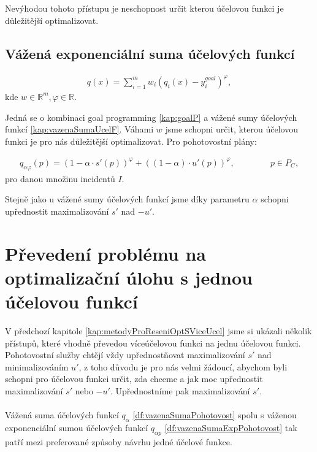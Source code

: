 Nevýhodou tohoto přístupu je neschopnost určit kterou účelovou funkci je důležitější optimalizovat.

\subsection{Vážená exponenciální suma účelových funkcí}\label{kap:vazenaSumUcF}

\begin{definice}
  \begin{align*}
    q(x) = \sum_{i=1}^{m} w_i (q_i(x) - y_i^{goal})^\varphi,
  \end{align*}
  kde $w \in \mathbb{R}^m, \varphi \in \mathbb{R}$.
  \\
\end{definice}

Jedná se o kombinaci goal programming \ref{kap:goalP} a vážené sumy účelových funkcí \ref{kap:vazenaSumaUcelF}.
Váhami $w$ jsme schopni určit, kterou účelovou funkci je pro nás důležitější optimalizovat. Pro pohotovostní plány:

\begin{definice}\label{df:vazenaSumaExpPohotovost}
  \begin{align*}
    q_{\alpha \varphi}(p) = (1 - \alpha \cdot s'(p))^\varphi + ((1 - \alpha) \cdot u'(p))^\varphi, \hspace{50pt} p \in P_C,
  \end{align*}
  pro danou množinu incidentů $I$.
  \\ 
\end{definice}

Stejně jako u vážené sumy účelových funkcí jsme díky parametru $\alpha$ schopni upřednostit maximalizování $s'$ nad $-u'$.

\section{Převedení problému na optimalizační úlohu s jednou účelovou funkcí}\label{kap:opt1Uc}

V předchozí kapitole \ref{kap:metodyProReseniOptSViceUcel} jsme si ukázali několik přístupů, které vhodně převedou víceúčelovou funkci na jednu účelovou funkci.
Pohotovostní služby chtějí vždy upřednostňovat maximalizování $s'$ nad minimalizováním $u'$,
z toho důvodu je pro nás velmi žádoucí, abychom byli schopni pro účelovou funkci určit, zda chceme a jak moc upřednostit maximalizování $s'$ nebo $-u'$.
Upřednostníme pak maximalizování $s'$.
\\
\\
Vážená suma účelových funkcí $q_{\alpha}$ \ref{df:vazenaSumaPohotovost} spolu s
váženou exponenciální sumou účelových funkcí $q_{\alpha p}$ \ref{df:vazenaSumaExpPohotovost} tak patří mezi preferované způsoby návrhu jedné účelové funkce.

